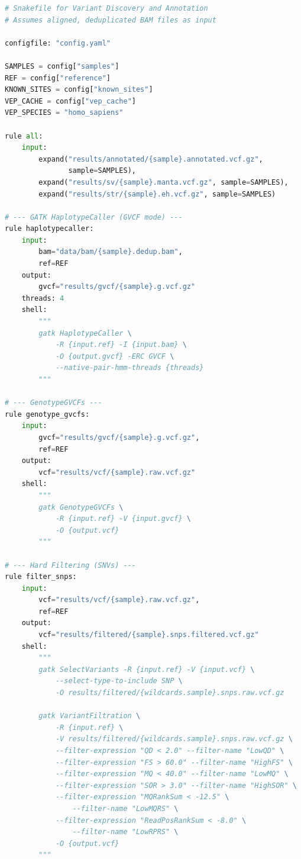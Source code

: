 \begin{lstlisting}[language=Python, caption={Snakemake pipeline for germline variant calling, filtering, and annotation.}, label={lst:snakemake_variants}]
# Snakefile for Variant Discovery and Annotation
# Assumes aligned, deduplicated BAM files as input

configfile: "config.yaml"

SAMPLES = config["samples"]
REF = config["reference"]
KNOWN_SITES = config["known_sites"]
VEP_CACHE = config["vep_cache"]
VEP_SPECIES = "homo_sapiens"

rule all:
    input:
        expand("results/annotated/{sample}.annotated.vcf.gz",
               sample=SAMPLES),
        expand("results/sv/{sample}.manta.vcf.gz", sample=SAMPLES),
        expand("results/str/{sample}.eh.vcf.gz", sample=SAMPLES)

# --- GATK HaplotypeCaller (GVCF mode) ---
rule haplotypecaller:
    input:
        bam="data/bam/{sample}.dedup.bam",
        ref=REF
    output:
        gvcf="results/gvcf/{sample}.g.vcf.gz"
    threads: 4
    shell:
        """
        gatk HaplotypeCaller \
            -R {input.ref} -I {input.bam} \
            -O {output.gvcf} -ERC GVCF \
            --native-pair-hmm-threads {threads}
        """

# --- GenotypeGVCFs ---
rule genotype_gvcfs:
    input:
        gvcf="results/gvcf/{sample}.g.vcf.gz",
        ref=REF
    output:
        vcf="results/vcf/{sample}.raw.vcf.gz"
    shell:
        """
        gatk GenotypeGVCFs \
            -R {input.ref} -V {input.gvcf} \
            -O {output.vcf}
        """

# --- Hard Filtering (SNVs) ---
rule filter_snps:
    input:
        vcf="results/vcf/{sample}.raw.vcf.gz",
        ref=REF
    output:
        vcf="results/filtered/{sample}.snps.filtered.vcf.gz"
    shell:
        """
        gatk SelectVariants -R {input.ref} -V {input.vcf} \
            --select-type-to-include SNP \
            -O results/filtered/{wildcards.sample}.snps.raw.vcf.gz

        gatk VariantFiltration \
            -R {input.ref} \
            -V results/filtered/{wildcards.sample}.snps.raw.vcf.gz \
            --filter-expression "QD < 2.0" --filter-name "LowQD" \
            --filter-expression "FS > 60.0" --filter-name "HighFS" \
            --filter-expression "MQ < 40.0" --filter-name "LowMQ" \
            --filter-expression "SOR > 3.0" --filter-name "HighSOR" \
            --filter-expression "MQRankSum < -12.5" \
                --filter-name "LowMQRS" \
            --filter-expression "ReadPosRankSum < -8.0" \
                --filter-name "LowRPRS" \
            -O {output.vcf}
        """


\end{lstlisting}
